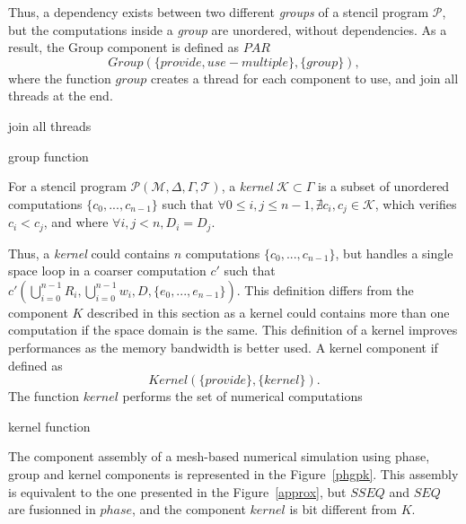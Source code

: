 Thus, a dependency exists between two different \emph{groups} of a stencil program $\mathcal{P}$, but the computations inside a \emph{group} are unordered, without dependencies. As a result, the Group component is defined as $PAR$
\begin{equation}
Group(\{provide,use-multiple\},\{group\}),
\end{equation}
 where the function $group$ creates a thread for each component to use, and join all threads at the end.

\begin{algorithm}[H]
 join all threads
 \label{alg:par}
 \caption{group function}
 \end{algorithm}

\begin{mydef}
For a stencil program $\mathcal{P}(\mathcal{M},\Delta,\Gamma,\mathcal{T})$, a \emph{kernel} $\mathcal{K} \subset \Gamma$ is a subset of unordered computations $\{c_0,...,c_{n-1}\}$ such that $\forall 0 \leq i,j \leq n-1, \nexists c_i,c_j \in \mathcal{K}$, which verifies $c_i<c_j$, and where $\forall i,j<n, D_i=D_j$.
\end{mydef}

\medskip
Thus, a \emph{kernel} could contains $n$ computations $\{c_0,...,c_{n-1}\}$, but handles a single space loop in a coarser computation $c'$ such that $c'(\bigcup_{i=0}^{n-1}R_i,\bigcup_{i=0}^{n-1}w_i,D,\{e_0,...,e_{n-1}\})$. This definition differs from the component $K$ described in this section as a kernel could contains more than one computation if the space domain is the same. This definition of a kernel improves performances as the memory bandwidth is better used. A kernel component if defined as
\begin{equation}
Kernel(\{provide\},\{kernel\}).
\end{equation}
 The function $kernel$ performs the set of numerical computations

\begin{algorithm}[H]
 \caption{kernel function}
 \end{algorithm}

\medskip
The component assembly of a mesh-based numerical simulation using phase, group and kernel components is represented in the Figure~\ref{phgpk}. This assembly is equivalent to the one presented in the Figure~\ref{approx}, but $SSEQ$ and $SEQ$ are fusionned in $phase$, and the component $kernel$ is bit different from $K$.

